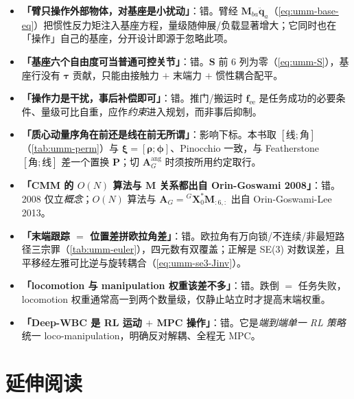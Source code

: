 \begin{itemize}
  \item \textbf{「臂只操作外部物体，对基座是小扰动」}：错。臂经 $\mathbf M_{ba}\ddot{\mathbf q}_a$（\cref{eq:umm-base-eq}）把惯性反力矩注入基座方程，量级随伸展/负载显著增大；它同时也在「操作」自己的基座，分开设计即源于忽略此项。
  \item \textbf{「基座六个自由度可当普通可控关节」}：错。$\mathbf S$ 前 $6$ 列为零（\cref{eq:umm-S}），基座行没有 $\boldsymbol\tau$ 贡献，只能由接触力 $+$ 末端力 $+$ 惯性耦合配平。
  \item \textbf{「操作力是干扰，事后补偿即可」}：错。推门/搬运时 $\mathbf f_{\text{ee}}$ 是任务成功的必要条件、量级可比自重，应作\emph{约束}进入规划，而非事后抑制。
  \item \textbf{「质心动量序角在前还是线在前无所谓」}：影响下标。本书取 $[\text{线};\text{角}]$（\cref{tab:umm-perm}）与 $\boldsymbol\xi=[\boldsymbol\rho;\boldsymbol\phi]$、Pinocchio 一致，与 Featherstone $[\text{角};\text{线}]$ 差一个置换 $\mathbf P$；切 $\mathbf A_G^{\text{ang}}$ 时须按所用约定取行。
  \item \textbf{「CMM 的 $O(N)$ 算法与 $\mathbf M$ 关系都出自 Orin-Goswami 2008」}：错。2008 仅立\emph{概念}\cite{orin2008centroidal}；$O(N)$ 算法与 $\mathbf A_G={}^G\mathbf X_0^*\mathbf M_{:6,:}$ 出自 Orin-Goswami-Lee 2013\cite{orin2013centroidal}。
  \item \textbf{「末端跟踪 $=$ 位置差拼欧拉角差」}：错。欧拉角有万向锁/不连续/非最短路径三宗罪（\cref{tab:umm-euler}），四元数有双覆盖；正解是 SE(3) 对数误差，且平移经左雅可比逆与旋转耦合（\cref{eq:umm-se3-Jinv}）。
  \item \textbf{「locomotion 与 manipulation 权重该差不多」}：错。跌倒 $=$ 任务失败，locomotion 权重通常高一到两个数量级，仅静止站立时才提高末端权重。
  \item \textbf{「Deep-WBC 是 RL 运动 $+$ MPC 操作」}：错。它是\emph{端到端单一 RL 策略}统一 loco-manipulation，明确反对解耦、全程无 MPC\cite{fu2022deep}。
\end{itemize}

\section*{延伸阅读}

